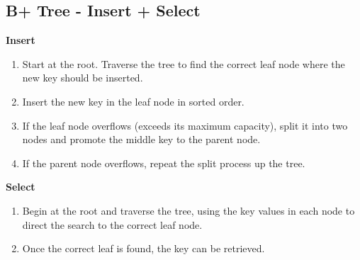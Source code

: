 \vspace{-0.3cm}
\subsection*{B+ Tree - Insert + Select}
\vspace{-0.1cm}


\noindent
\textbf{Insert}

\begin{enumerate}[noitemsep,leftmargin=*]
\item{Start at the root. Traverse the tree to find the correct leaf node where the new key should be inserted.}
\item{Insert the new key in the leaf node in sorted order.}
\item{If the leaf node overflows (exceeds its maximum capacity), split it into two nodes and promote the middle key to the parent node.}
\item{If the parent node overflows, repeat the split process up the tree.}
\end{enumerate}


\noindent
\textbf{Select}

\begin{enumerate}[noitemsep,leftmargin=*]
\item{Begin at the root and traverse the tree, using the key values in each node to direct the search to the correct leaf node.}
\item{Once the correct leaf is found, the key can be retrieved.}
\end{enumerate}



